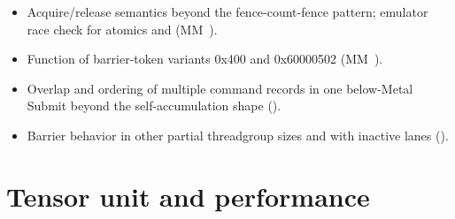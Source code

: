 \begin{itemize}
  (, ).
\item Acquire/release semantics beyond the fence-count-fence pattern; emulator race check for atomics and  (MM~).
\item Function of barrier-token variants 0x400 and 0x60000502 (MM~).
\item Overlap and ordering of multiple command records in one below-Metal Submit beyond the self-accumulation shape
  ().
\item Barrier behavior in other partial threadgroup sizes and with inactive lanes ().
\end{itemize}

\section{Tensor unit and performance}\label{sec:tensor-unit-performance}

